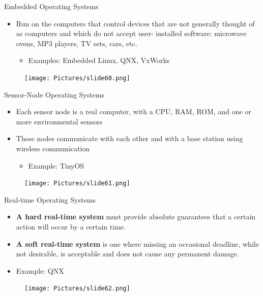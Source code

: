 \documentclass{beamer}
\begin{document}
\begin{frame}
{\centerline{Embedded Operating Systems}}
\begin{itemize}
    \item Run on the computers that control devices that are not generally thought of as computers and which do not accept user- installed software: microwave ovens, MP3 players, TV sets, cars, etc.
    \begin{itemize}
        \item Examples: Embedded Linux, QNX, VxWorks
    \end{itemize}
\end{itemize}
\begin{figure}
    \centering
    \texttt{[image: Pictures/slide60.png]}
\end{figure}
\end{frame}

\begin{frame}
{\centerline{Sensor-Node Operating Systems}}
\begin{itemize}
    \item Each sensor node is a real computer, with a CPU, RAM, ROM, and one or more environmental sensors 
    \item These nodes communicate with each other and with a base station using wireless communication
    \begin{itemize}
        \item Example: TinyOS
    \end{itemize}
\end{itemize}
\begin{figure}
    \centering
    \texttt{[image: Pictures/slide61.png]}
\end{figure}
\end{frame}

\begin{frame}
{\centerline{Real-time Operating Systems}}
\begin{itemize}
    \item \textbf{A hard real-time system} must provide absolute guarantees that a certain action will occur by a certain time.
    \item \textbf{A soft real-time system} is one where missing an occasional deadline, while not desirable, is acceptable and does not cause any permanent damage.
    \item Example: QNX
\end{itemize}
\begin{figure}
    \centering
    \texttt{[image: Pictures/slide62.png]}
\end{figure}
\end{frame}
\end{document}
